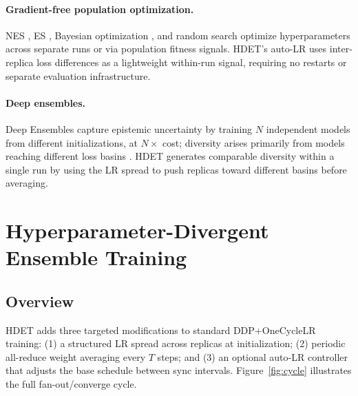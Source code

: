 \documentclass{article}
\begin{document}
\paragraph{Gradient-free population optimization.}
NES \citep{wierstra2014natural}, ES \citep{salimans2017evolution}, Bayesian
optimization \citep{snoek2012practical}, and random search \citep{bergstra2011algorithms}
optimize hyperparameters across separate runs or via population fitness signals.
HDET's auto-LR uses inter-replica loss differences as a lightweight within-run signal,
requiring no restarts or separate evaluation infrastructure.

\paragraph{Deep ensembles.}
Deep Ensembles \citep{lakshminarayanan2017simple} capture epistemic uncertainty by
training $N$ independent models from different initializations, at $N\times$ cost;
diversity arises primarily from models reaching different loss basins
\citep{fort2019deep}.
HDET generates comparable diversity within a single run by using the LR spread to
push replicas toward different basins before averaging.

\section{Hyperparameter-Divergent Ensemble Training}
\label{sec:method}

\subsection{Overview}

HDET adds three targeted modifications to standard DDP+OneCycleLR training:
(1) a structured LR spread across replicas at initialization;
(2) periodic all-reduce weight averaging every $T$ steps;
and (3) an optional auto-LR controller that adjusts the base schedule between sync
intervals.  Figure~\ref{fig:cycle} illustrates the full fan-out/converge cycle.
\end{document}
